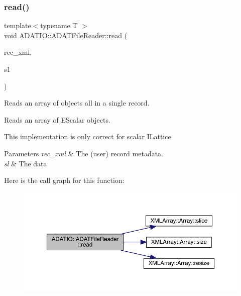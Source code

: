 \subsubsection{\texorpdfstring{read()}{read()}\hspace{0.1cm}{\footnotesize\ttfamily [2/7]}}
{\footnotesize\ttfamily template$<$typename T $>$ \\
void A\+D\+A\+T\+I\+O\+::\+A\+D\+A\+T\+File\+Reader\+::read (\begin{DoxyParamCaption}\item[{\mbox{\hyperlink{classADATXML_1_1XMLReader}{X\+M\+L\+Reader}} \&}]{rec\+\_\+xml,  }\item[{\mbox{\hyperlink{classXMLArray_1_1Array}{Array}}$<$ \mbox{\hyperlink{classENSEM_1_1EScalar}{E\+Scalar}}$<$ T $>$ $>$ \&}]{s1 }\end{DoxyParamCaption})}



Reads an array of objects all in a single record. 

Reads an array of E\+Scalar objects.

This implementation is only correct for scalar I\+Lattice


\begin{DoxyParams}{Parameters}
{\em rec\+\_\+xml} & The (user) record metadata. \\
\hline
{\em sl} & The data \\
\hline
\end{DoxyParams}
Here is the call graph for this function\+:\nopagebreak
\begin{figure}[H]
\begin{center}
\leavevmode
\includegraphics[width=350pt]{db/de5/group__qio_ga32969d6bfdfe9da2912e92d1f0871c20_cgraph}
\end{center}
\end{figure}
\mbox{\label{group__qio_ga2179348a566e0224ed2122acfabf8bc9}} 
